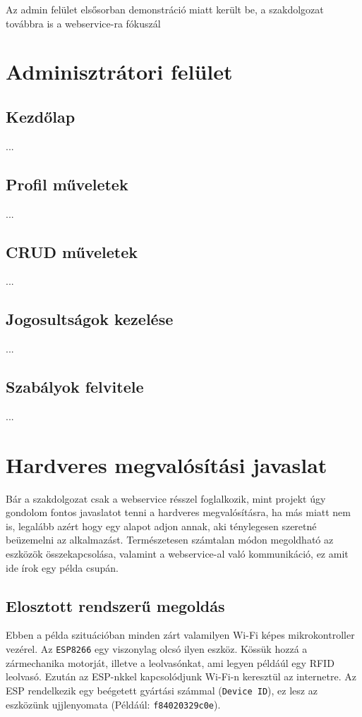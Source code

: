 \documentclass[a4paper,12pt]{thesis-ekf}
\theoremstyle{definition}
\begin{document}
		Az admin felület elsősorban demonstráció miatt került be, a szakdolgozat továbbra is a webservice-ra fókuszál
	\chapter{Adminisztrátori felület}\label{ch-Admin}
		\section{Kezdőlap}
			...
		\section{Profil műveletek}
			...
		\section{CRUD műveletek}
			...
		\section{Jogosultságok kezelése}
			...
		\section{Szabályok felvitele}
			...
	\chapter{Hardveres megvalósítási javaslat}\label{ch-Hardware}
		Bár a szakdolgozat csak a webservice résszel foglalkozik, mint projekt úgy gondolom fontos javaslatot tenni a hardveres megvalósításra, ha más miatt nem is, legalább azért hogy egy alapot adjon annak, aki ténylegesen szeretné beüzemelni az alkalmazást. Természetesen számtalan módon megoldható az eszközök összekapcsolása, valamint a webservice-al való kommunikáció, ez amit ide írok egy példa csupán.
		
		\section{Elosztott rendszerű megoldás}
			Ebben a példa szituációban minden zárt valamilyen Wi-Fi képes mikrokontroller vezérel. Az \texttt{ESP8266} egy viszonylag olcsó ilyen eszköz. Kössük hozzá a zármechanika motorját, illetve a leolvasónkat, ami legyen példáúl egy RFID leolvasó. Ezután az ESP-nkkel kapcsolódjunk Wi-Fi-n keresztül az internetre. Az ESP rendelkezik egy beégetett gyártási számmal (\texttt{Device ID}), ez lesz az eszközünk ujjlenyomata (Példáúl: \texttt{f84020329c0e}).
			
\end{document}

